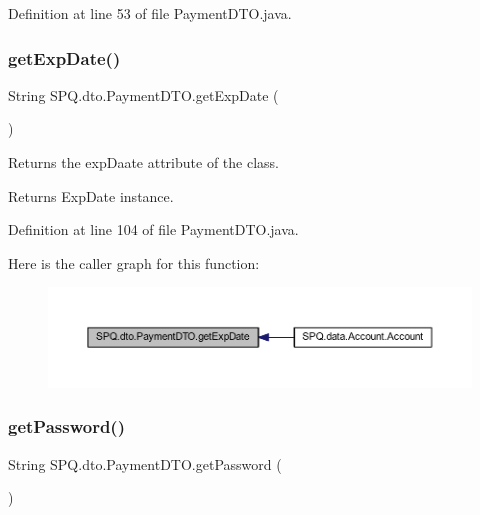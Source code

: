 Definition at line 53 of file Payment\+D\+T\+O.\+java.

\mbox{\label{class_s_p_q_1_1dto_1_1_payment_d_t_o_aa91402a8c96a306fcf125973e4f35912}} 
\subsubsection{\texorpdfstring{get\+Exp\+Date()}{getExpDate()}\hspace{0.1cm}{\footnotesize\ttfamily [3/3]}}
{\footnotesize\ttfamily String S\+P\+Q.\+dto.\+Payment\+D\+T\+O.\+get\+Exp\+Date (\begin{DoxyParamCaption}{ }\end{DoxyParamCaption})}

Returns the exp\+Daate attribute of the class. \begin{DoxyReturn}{Returns}
Exp\+Date instance. 
\end{DoxyReturn}


Definition at line 104 of file Payment\+D\+T\+O.\+java.

Here is the caller graph for this function\+:\nopagebreak
\begin{figure}[H]
\begin{center}
\leavevmode
\includegraphics[width=350pt]{class_s_p_q_1_1dto_1_1_payment_d_t_o_aa91402a8c96a306fcf125973e4f35912_icgraph}
\end{center}
\end{figure}
\mbox{\label{class_s_p_q_1_1dto_1_1_payment_d_t_o_ae012449dd0baea7f169bb64dcf973dec}} 
\subsubsection{\texorpdfstring{get\+Password()}{getPassword()}\hspace{0.1cm}{\footnotesize\ttfamily [1/3]}}
{\footnotesize\ttfamily String S\+P\+Q.\+dto.\+Payment\+D\+T\+O.\+get\+Password (\begin{DoxyParamCaption}{ }\end{DoxyParamCaption})}



